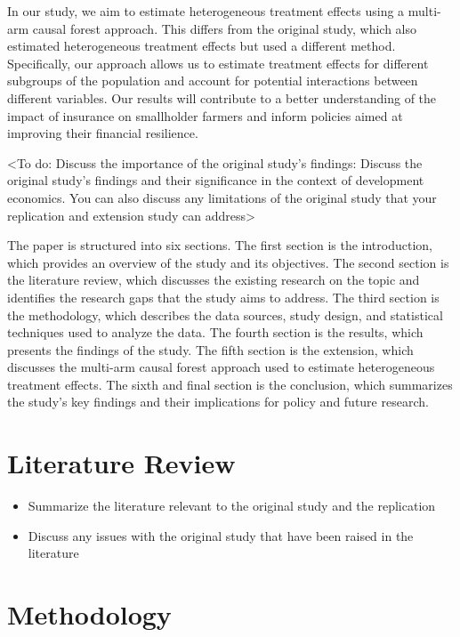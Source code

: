 \documentclass[AER]{AEA}
\begin{document}
In our study, we aim to estimate heterogeneous treatment effects using a
multi-arm causal forest approach. This differs from the original study,
which also estimated heterogeneous treatment effects but used a
different method. Specifically, our approach allows us to estimate
treatment effects for different subgroups of the population and account
for potential interactions between different variables. Our results will
contribute to a better understanding of the impact of insurance on
smallholder farmers and inform policies aimed at improving their
financial resilience.

\textless To do: Discuss the importance of the original study's
findings: Discuss the original study's findings and their significance
in the context of development economics. You can also discuss any
limitations of the original study that your replication and extension
study can address\textgreater{}

The paper is structured into six sections. The first section is the
introduction, which provides an overview of the study and its
objectives. The second section is the literature review, which discusses
the existing research on the topic and identifies the research gaps that
the study aims to address. The third section is the methodology, which
describes the data sources, study design, and statistical techniques
used to analyze the data. The fourth section is the results, which
presents the findings of the study. The fifth section is the extension,
which discusses the multi-arm causal forest approach used to estimate
heterogeneous treatment effects. The sixth and final section is the
conclusion, which summarizes the study's key findings and their
implications for policy and future research.

\section{Literature Review}

\begin{itemize}

\item Summarize the literature relevant to the original study and the replication

\item Discuss any issues with the original study that have been raised in the literature

\end{itemize}

\section{Methodology}
\end{document}
